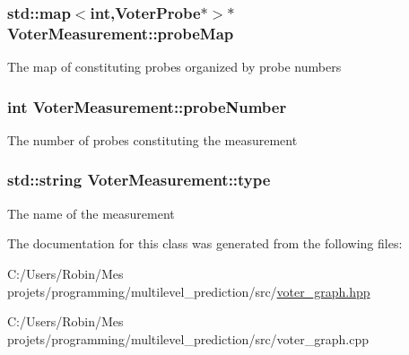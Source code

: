 \subsubsection[{probe\+Map}]{\setlength{\rightskip}{0pt plus 5cm}std\+::map$<$int,{\bf Voter\+Probe}$\ast$$>$$\ast$ Voter\+Measurement\+::probe\+Map}\label{class_voter_measurement_abdee5af4a48de3334ace791912033e28}
The map of constituting probes organized by probe numbers \hypertarget{class_voter_measurement_a8cd0709289a4d1af82586d4b09c5a43a}{}
\subsubsection[{probe\+Number}]{\setlength{\rightskip}{0pt plus 5cm}int Voter\+Measurement\+::probe\+Number}\label{class_voter_measurement_a8cd0709289a4d1af82586d4b09c5a43a}
The number of probes constituting the measurement \hypertarget{class_voter_measurement_ad4471a133827f052622a84c4a451aabe}{}
\subsubsection[{type}]{\setlength{\rightskip}{0pt plus 5cm}std\+::string Voter\+Measurement\+::type}\label{class_voter_measurement_ad4471a133827f052622a84c4a451aabe}
The name of the measurement 

The documentation for this class was generated from the following files\+:\begin{DoxyCompactItemize}
\item 
C\+:/\+Users/\+Robin/\+Mes projets/programming/multilevel\+\_\+prediction/src/\hyperlink{voter__graph_8hpp}{voter\+\_\+graph.\+hpp}\item 
C\+:/\+Users/\+Robin/\+Mes projets/programming/multilevel\+\_\+prediction/src/voter\+\_\+graph.\+cpp\end{DoxyCompactItemize}
